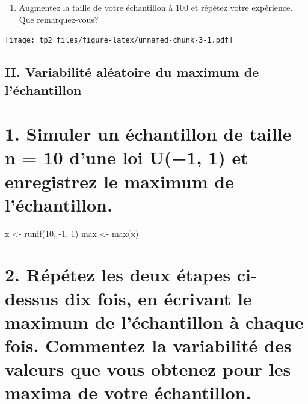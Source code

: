 \documentclass[
]{article}
\newenvironment{Shaded}{\begin{snugshade}}{\end{snugshade}}
\newcommand{\DecValTok}[1]{\textcolor[rgb]{0.00,0.00,0.81}{#1}}
\newcommand{\FunctionTok}[1]{\textcolor[rgb]{0.00,0.00,0.00}{#1}}
\newcommand{\NormalTok}[1]{#1}
\newcommand{\OtherTok}[1]{\textcolor[rgb]{0.56,0.35,0.01}{#1}}
\newcommand{\SpecialCharTok}[1]{\textcolor[rgb]{0.00,0.00,0.00}{#1}}
\providecommand{\tightlist}{%
  \setlength{\itemsep}{0pt}\setlength{\parskip}{0pt}}
\begin{document}
\begin{enumerate}
\def\labelenumi{\arabic{enumi}.}
\setcounter{enumi}{3}
\tightlist
\item
  Augmentez la taille de votre échantillon à 100 et répétez votre
  expérience. Que remarquez-vous?
\end{enumerate}

\texttt{[image: tp2\_files/figure-latex/unnamed-chunk-3-1.pdf]}

\hypertarget{ii.-variabilituxe9-aluxe9atoire-du-maximum-de-luxe9chantillon}{%
\subsection{II. Variabilité aléatoire du maximum de
l'échantillon}\label{ii.-variabilituxe9-aluxe9atoire-du-maximum-de-luxe9chantillon}}

\hypertarget{simuler-un-uxe9chantillon-de-taille-n-10-dune-loi-u1-1-et-enregistrez-le-maximum-de-luxe9chantillon.}{%
\section{1. Simuler un échantillon de taille n = 10 d'une loi U(−1, 1)
et enregistrez le maximum de
l'échantillon.}\label{simuler-un-uxe9chantillon-de-taille-n-10-dune-loi-u1-1-et-enregistrez-le-maximum-de-luxe9chantillon.}}

\begin{Shaded}
\begin{Highlighting}[]
\NormalTok{x }\OtherTok{\textless{}{-}} \FunctionTok{runif}\NormalTok{(}\DecValTok{10}\NormalTok{, }\SpecialCharTok{{-}}\DecValTok{1}\NormalTok{, }\DecValTok{1}\NormalTok{)}
\NormalTok{max }\OtherTok{\textless{}{-}} \FunctionTok{max}\NormalTok{(x)}
\end{Highlighting}
\end{Shaded}

\hypertarget{ruxe9puxe9tez-les-deux-uxe9tapes-ci-dessus-dix-fois-en-uxe9crivant-le-maximum-de-luxe9chantillon-uxe0-chaque-fois.-commentez-la-variabilituxe9-des-valeurs-que-vous-obtenez-pour-les-maxima-de-votre-uxe9chantillon.}{%
\section{2. Répétez les deux étapes ci-dessus dix fois, en écrivant le
maximum de l'échantillon à chaque fois. Commentez la variabilité des
valeurs que vous obtenez pour les maxima de votre
échantillon.}\label{ruxe9puxe9tez-les-deux-uxe9tapes-ci-dessus-dix-fois-en-uxe9crivant-le-maximum-de-luxe9chantillon-uxe0-chaque-fois.-commentez-la-variabilituxe9-des-valeurs-que-vous-obtenez-pour-les-maxima-de-votre-uxe9chantillon.}}
\end{document}
